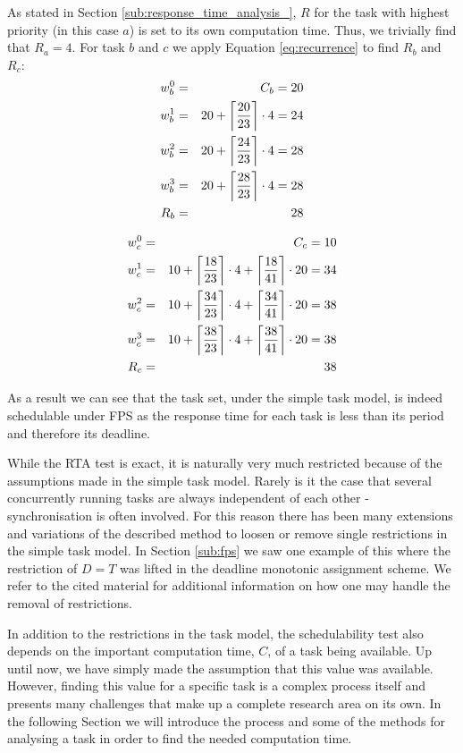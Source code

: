As stated in Section \ref{sub:response_time_analysis_}, $R$ for the task with highest priority (in this case $a$) is set to its own computation time. Thus, we trivially find that $R_a = 4$. For task $b$ and $c$ we apply Equation \ref{eq:recurrence} to find $R_b$ and $R_c$:
\begin{eqnarray}
    w_{b}^0 &=& C_{b} = 20 \nonumber \\ 
    w_{b}^1 &=& 20 + \ceil[\bigg]{\frac{20}{23}} \cdot 4 = 24 \nonumber \\ 
    w_{b}^2 &=& 20 + \ceil[\bigg]{\frac{24}{23}} \cdot 4 = 28 \nonumber \\
    w_{b}^3 &=& 20 + \ceil[\bigg]{\frac{28}{23}} \cdot 4 = 28 \nonumber \\
    R_{b} &=& 28
\end{eqnarray}

\begin{eqnarray}
    w_{c}^0 &=& C_{c} = 10 \nonumber \\ 
    w_{c}^1 &=& 10 + \ceil[\bigg]{\frac{18}{23}} \cdot 4 + \ceil[\bigg]{\frac{18}{41}} \cdot 20 = 34 \nonumber \\ 
    w_{c}^2 &=& 10 + \ceil[\bigg]{\frac{34}{23}} \cdot 4 + \ceil[\bigg]{\frac{34}{41}} \cdot 20 = 38 \nonumber \\ 
    w_{c}^3 &=& 10 + \ceil[\bigg]{\frac{38}{23}} \cdot 4 + \ceil[\bigg]{\frac{38}{41}} \cdot 20 = 38 \nonumber \\ 
    R_{c} &=& 38
\end{eqnarray}

As a result we can see that the task set, under the simple task model, is indeed schedulable under FPS as the response time for each task is less than its period and therefore its deadline.

While the RTA test is exact, it is naturally very much restricted because of the assumptions made in the simple task model. Rarely is it the case that several concurrently running tasks are always independent of each other - synchronisation is often involved. For this reason there has been many extensions and variations of the described method to loosen or remove single restrictions in the simple task model. In Section \ref{sub:fps} we saw one example of this where the restriction of $D = T$ was lifted in the deadline monotonic assignment scheme. We refer to the cited material for additional information on how one may handle the removal of restrictions.

In addition to the restrictions in the task model, the schedulability test also depends on the important computation time, $C$, of a task being available. Up until now, we have simply made the assumption that this value was available. However, finding this value for a specific task is a complex process itself and presents many challenges that make up a complete research area on its own. In the following Section we will introduce the process and some of the methods for analysing a task in order to find the needed computation time.

